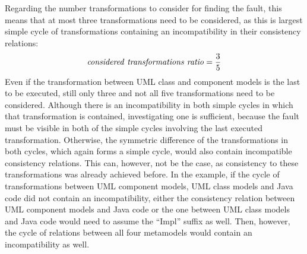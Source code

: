 Regarding the number transformations to consider for finding the fault, this means that at most three transformations need to be considered, as this is largest simple cycle of transformations containing an incompatibility in their consistency relations:
\begin{align*}
    \mathit{considered\ transformations\ ratio} = \frac{3}{5}
\end{align*}
Even if the transformation between \gls{UML} class and component models is the last to be executed, still only three and not all five transformations need to be considered.
Although there is an incompatibility in both simple cycles in which that transformation is contained, investigating one is sufficient, because the fault must be visible in both of the simple cycles involving the last executed transformation.
Otherwise, the symmetric difference of the transformations in both cycles, which again forms a simple cycle, would also contain incompatible consistency relations.
This can, however, not be the case, as consistency to these transformations was already achieved before.
In the example, if the cycle of transformations between \gls{UML} component models, \gls{UML} class models and Java code did not contain an incompatibility, either the consistency relation between \gls{UML} component models and Java code or the one between \gls{UML} class models and Java code would need to assume the \enquote{Impl} suffix as well. Then, however, the cycle of relations between all four metamodels would contain an incompatibility as well.


